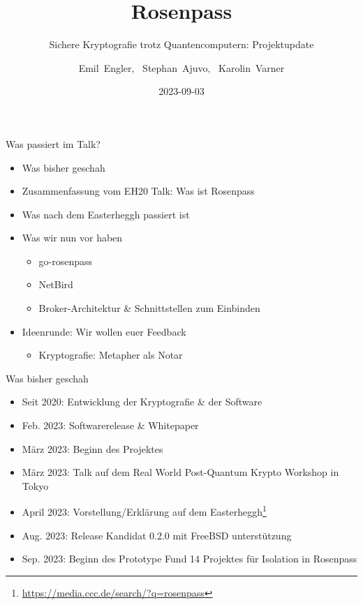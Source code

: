 \documentclass{rosenpass-beamer}
\date{2023-09-03}
\title{Rosenpass}
\subtitle{
  Sichere Kryptografie trotz Quantencomputern: Projektupdate
}
\author{Emil~Engler, \ Stephan~Ajuvo, \ Karolin~Varner}
\begin{document}
\maketitle

		
\begin{frame}{Was passiert im Talk?}
\begin{itemize}
  \item Was bisher geschah
  \item Zusammenfassung vom EH20 Talk: Was ist Rosenpass
  \item Was nach dem Easterheggh passiert ist
  \item Was wir nun vor haben
    \begin{itemize}
      \item go-rosenpass
      \item NetBird
      \item Broker-Architektur \& Schnittstellen zum Einbinden
    \end{itemize}
  \item Ideenrunde: Wir wollen euer Feedback
    \begin{itemize}
      \item Kryptografie: Metapher als Notar
    \end{itemize}
\end{itemize}
\end{frame}

\begin{frame}{Was bisher geschah}
  \begin{itemize}
    \item Seit 2020: Entwicklung der Kryptografie \& der Software
    \item Feb. 2023: Softwarerelease \& Whitepaper
    \item März 2023: Beginn des Projektes 
    \item März 2023: Talk auf dem Real World Post-Quantum Krypto Workshop in Tokyo
    \item April 2023: Vorstellung/Erklärung auf dem Easterheggh\footnote{\url{https://media.ccc.de/search/?q=rosenpass}}
    \item Aug. 2023: Release Kandidat 0.2.0 mit FreeBSD unterstützung
    \item Sep. 2023: Beginn des Prototype Fund 14 Projektes für Isolation in Rosenpass
  \end{itemize}
\end{frame}
\end{document}
